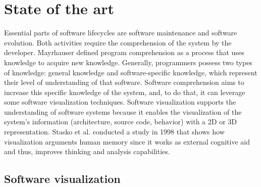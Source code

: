 
\chapter[Related Works]{State of the art}
\graphicspath{ {images/stateOfArt} }


Essential parts of software lifecycles are software maintenance and software evolution. 
Both activities require the comprehension of the system by the developer. 
Mayrhauser \cite{VonMayrhauser1995} defined program comprehension as a process that uses knowledge to acquire new knowledge. 
Generally, programmers possess two types of knowledge: general knowledge and software-specific knowledge, which represent their level of understanding of that software. 
Software comprehension aims to increase this specific knowledge of the system, and, to do that, it can leverage some software visualization techniques. 
Software visualization supports the understanding of software systems because it enables the visualization of the system's information (architecture, source code, behavior) with a 2D or 3D representation. 
Stasko et al.\cite{Stasko2008} conducted a study in 1998 that shows how visualization arguments human memory since it works as external cognitive aid and thus, improves thinking and analysis capabilities. \\

\section{Software visualization}

